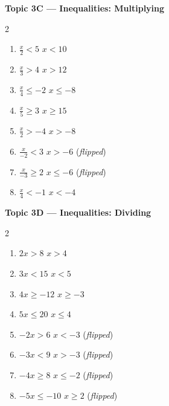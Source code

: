 \documentclass[12pt]{article}
\begin{document}
\vspace{8pt}
\noindent\textbf{Topic 3C --- Inequalities: Multiplying}
\begin{multicols}{2}
\begin{enumerate}[label=\textbf{\arabic*.}, itemsep=3pt]
  \item $\frac{x}{2}<5$ \hfill $x<10$
  \item $\frac{x}{3}>4$ \hfill $x>12$
  \item $\frac{x}{4}\leq -2$ \hfill $x\leq -8$
  \item $\frac{x}{5}\geq 3$ \hfill $x\geq 15$
  \item $\frac{x}{2}>-4$ \hfill $x>-8$
  \item $\frac{x}{-2}<3$ \hfill $x>-6$ \;(\textit{flipped})
  \item $\frac{x}{-3}\geq 2$ \hfill $x\leq -6$ \;(\textit{flipped})
  \item $\frac{x}{4}<-1$ \hfill $x<-4$
\end{enumerate}
\end{multicols}

\vspace{8pt}
\noindent\textbf{Topic 3D --- Inequalities: Dividing}
\begin{multicols}{2}
\begin{enumerate}[label=\textbf{\arabic*.}, itemsep=3pt]
  \item $2x>8$ \hfill $x>4$
  \item $3x<15$ \hfill $x<5$
  \item $4x\geq -12$ \hfill $x\geq -3$
  \item $5x\leq 20$ \hfill $x\leq 4$
  \item $-2x>6$ \hfill $x<-3$ \;(\textit{flipped})
  \item $-3x<9$ \hfill $x>-3$ \;(\textit{flipped})
  \item $-4x\geq 8$ \hfill $x\leq -2$ \;(\textit{flipped})
  \item $-5x\leq -10$ \hfill $x\geq 2$ \;(\textit{flipped})
\end{enumerate}
\end{multicols}
\end{document}
